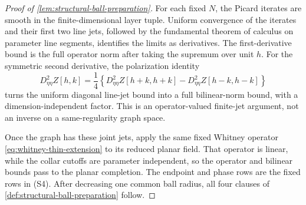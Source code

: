 \begin{proof}[Proof of \cref{lem:structural-ball-preparation}]
For each fixed \(N\), the Picard iterates are smooth in the finite-dimensional
layer tuple.  Uniform convergence of the iterates and their first two line
jets, followed by the fundamental theorem of calculus on parameter line
segments, identifies the limits as derivatives.  The first-derivative bound
is the full operator norm after taking the supremum over unit \(h\).  For the
symmetric second derivative, the polarization identity
\begin{equation}
 D_{\eta\eta}^2Z[h,k]
 =\frac14\left\{D_{\eta\eta}^2Z[h+k,h+k]
               -D_{\eta\eta}^2Z[h-k,h-k]\right\}      \label{eq:full-ball-polarization}
\end{equation}
turns the uniform diagonal line-jet bound into a full bilinear-norm bound,
with a dimension-independent factor.  This is an operator-valued finite-jet
argument, not an inverse on a same-regularity graph space.

Once the graph has these joint jets, apply the same fixed Whitney operator
\cref{eq:whitney-thin-extension} to its reduced planar field.  That operator
is linear, while the collar cutoffs are parameter independent, so the
operator and bilinear bounds pass to the planar completion.  The endpoint and
phase rows are the fixed rows in \textup{(S4)}.  After decreasing one common
ball radius, all four clauses of
\cref{def:structural-ball-preparation} follow.
\end{proof}

